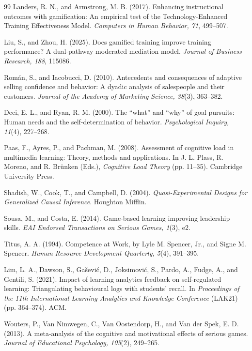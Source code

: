 \documentclass[12pt]{report}
\begin{document}
\begin{thebibliography}{99}
Landers, R. N., and Armstrong, M. B. (2017).
Enhancing instructional outcomes with gamification: An empirical test of the Technology-Enhanced Training Effectiveness Model.
\textit{Computers in Human Behavior, 71}, 499--507.

Liu, S., and Zhou, H. (2025).
Does gamified training improve training performance? A dual-pathway moderated mediation model.
\textit{Journal of Business Research, 188}, 115086.

Rom\'an, S., and Iacobucci, D. (2010).
Antecedents and consequences of adaptive selling confidence and behavior: A dyadic analysis of salespeople and their customers.
\textit{Journal of the Academy of Marketing Science, 38}(3), 363--382.

Deci, E. L., and Ryan, R. M. (2000).
The ``what'' and ``why'' of goal pursuits: Human needs and the self-determination of behavior.
\textit{Psychological Inquiry, 11}(4), 227--268.

Paas, F., Ayres, P., and Pachman, M. (2008).
Assessment of cognitive load in multimedia learning: Theory, methods and applications.
In J. L. Plass, R. Moreno, and R. Br\"unken (Eds.), \textit{Cognitive Load Theory} (pp. 11--35).
Cambridge University Press.

Shadish, W., Cook, T., and Campbell, D. (2004).
\textit{Quasi-Experimental Designs for Generalized Causal Inference}.
Houghton Mifflin.

Sousa, M., and Costa, E. (2014).
Game-based learning improving leadership skills.
\textit{EAI Endorsed Transactions on Serious Games, 1}(3), e2.

Titus, A. A. (1994).
Competence at Work, by Lyle M. Spencer, Jr., and Signe M. Spencer.
\textit{Human Resource Development Quarterly, 5}(4), 391--395.

Lim, L. A., Dawson, S., Gašević, D., Joksimović, S., Pardo, A., Fudge, A., and Gentili, S. (2021).
Impact of learning analytics feedback on self-regulated learning: Triangulating behavioural logs with students' recall.
In \textit{Proceedings of the 11th International Learning Analytics and Knowledge Conference} (LAK21) (pp. 364--374).
ACM.

Wouters, P., Van Nimwegen, C., Van Oostendorp, H., and Van der Spek, E. D. (2013).
A meta-analysis of the cognitive and motivational effects of serious games.
\textit{Journal of Educational Psychology, 105}(2), 249--265.


\end{thebibliography}
\end{document}
